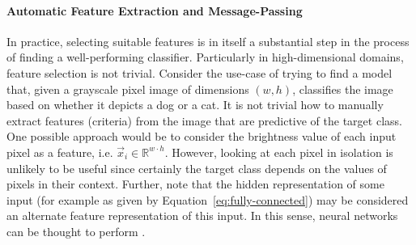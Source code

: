 \documentclass[
	fontsize=10pt, %
	twoside=true, %
	secnumdepth=1, %
  toc=indentunnumbered %
]{kaobook}
\begin{document}
\paragraph{Automatic Feature Extraction and Message-Passing}
In practice, selecting suitable features is in itself a substantial
step in the process of finding a well-performing classifier.
%
Particularly in high-dimensional domains, feature selection is not trivial.
Consider the use-case of trying to find a model that, given a grayscale pixel
image of dimensions $(w, h)$, classifies the image based on whether it depicts a
dog or a cat. It is not trivial how to manually extract features (criteria) from
the image that are predictive of the target class. One possible approach
would be to consider the brightness value of each input pixel as a feature, i.e.
$\vec x_i \in \mathbb{R}^{w \cdot h}$. However, looking at each
pixel in isolation is unlikely to be useful since certainly the target class
depends on the values of pixels in their context.
Further, note that the hidden representation of some input (for example as given by
Equation~\ref{eq:fully-connected}) may be considered an alternate feature representation
of this input. In this sense, neural networks can be thought to perform
. 
\end{document}
